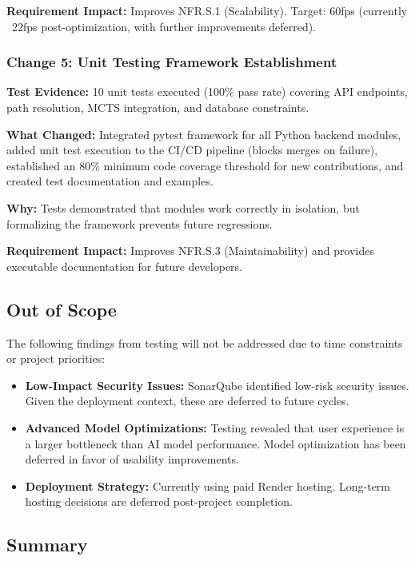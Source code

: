 \documentclass[12pt, titlepage]{article}
\begin{document}
\noindent
\textbf{Requirement Impact:} Improves NFR.S.1 (Scalability). Target: 60fps (currently ~22fps post-optimization, with further improvements deferred).

\subsubsection*{Change 5: Unit Testing Framework Establishment}

\noindent
\textbf{Test Evidence:} 10 unit tests executed (100\% pass rate) covering API endpoints, path resolution, MCTS integration, and database constraints.

\noindent
\textbf{What Changed:} Integrated pytest framework for all Python backend modules, added unit test execution to the CI/CD pipeline (blocks merges on failure), established an 80\% minimum code coverage threshold for new contributions, and created test documentation and examples.

\noindent
\textbf{Why:} Tests demonstrated that modules work correctly in isolation, but formalizing the framework prevents future regressions.

\noindent
\textbf{Requirement Impact:} Improves NFR.S.3 (Maintainability) and provides executable documentation for future developers.

\subsection*{Out of Scope}

The following findings from testing will not be addressed due to time constraints or project priorities:

\begin{itemize}
    \item \textbf{Low-Impact Security Issues:} SonarQube identified low-risk security issues. Given the deployment context, these are deferred to future cycles.
    \item \textbf{Advanced Model Optimizations:} Testing revealed that user experience is a larger bottleneck than AI model performance. Model optimization has been deferred in favor of usability improvements.
    \item \textbf{Deployment Strategy:} Currently using paid Render hosting. Long-term hosting decisions are deferred post-project completion.
\end{itemize}

\subsection*{Summary}
\end{document}
